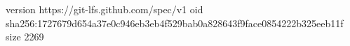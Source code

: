 version https://git-lfs.github.com/spec/v1
oid sha256:1727679d654a37e0c946eb3eb4f529bab0a828643f9face0854222b325eeb11f
size 2269
